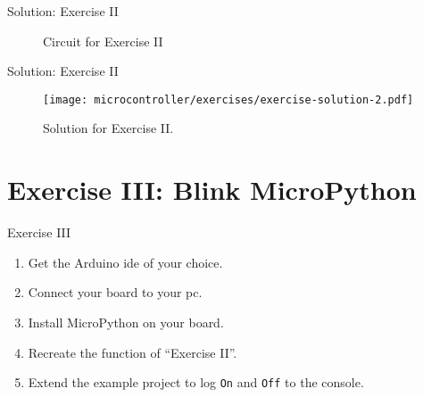 \documentclass[aspectratio=169]{beamer}
\begin{document}
\begin{frame}{Solution: Exercise II}
    \begin{figure}
        \caption{Circuit for Exercise II}
    \end{figure}
\end{frame}

\begin{frame}{Solution: Exercise II}
    \begin{figure}
        \texttt{[image: microcontroller/exercises/exercise-solution-2.pdf]}
        \caption{Solution for Exercise II.}
    \end{figure}
\end{frame}

\section{Exercise III: Blink MicroPython}

\begin{frame}
    \begin{exampleblock}{Exercise III}
        \begin{enumerate}
            \item Get the Arduino\textregistered{} \acs{ide} of your choice.
            \item Connect your board to your \acs{pc}.
            \item Install MicroPython on your board.
            \item Recreate the function of ``Exercise II''.
            \item Extend the example project to log \texttt{On} and \texttt{Off} to the console.%
        \end{enumerate}
    \end{exampleblock}
\end{frame}
\end{document}
